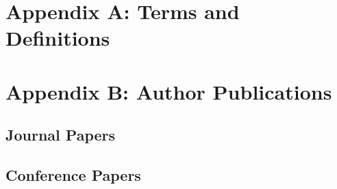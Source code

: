 
\chapter{Appendix A: Terms and Definitions}
\label{chap:terms_definitions}

\chapter{Appendix B: Author Publications}
\label{chap:publications}

\section{Journal Papers}

\section{Conference Papers}
